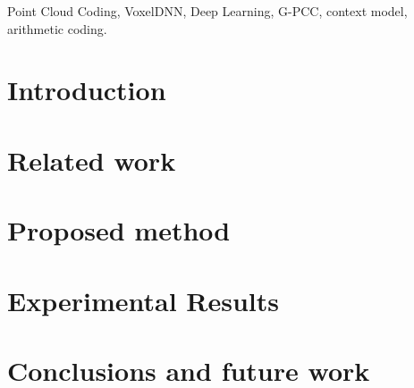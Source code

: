 \documentclass[journal]{IEEEtran}
\begin{document}
\begin{IEEEkeywords}
Point Cloud Coding, VoxelDNN, Deep Learning, G-PCC, context model, arithmetic coding.
\end{IEEEkeywords}


%
\section{Introduction}
% 
% 
% 
% 


\label{sec:intro}





\section{Related work}
\label{sec:stateoftheart}


\section{Proposed method}
\label{proposedmethod}



\section{Experimental Results}
\label{performanceeval}


\section{Conclusions and future work}
\label{conclusion}





\ifCLASSOPTIONcaptionsoff
  \newpage
\fi






\end{document}
